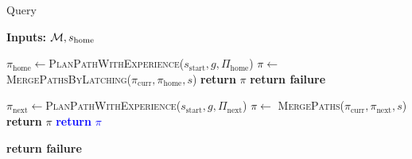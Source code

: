 \documentclass[conference]{IEEEtran}
\begin{document}
\begin{algorithm}[t]
\caption{Query}\label{alg:query}  
    \AlgFontSize
\hspace*{\algorithmicindent} \textbf{Inputs:} $\mathcal{M}, s_{\textrm{home}}$
\begin{algorithmic}[1]
 
            \State $\pi_{\textrm{home}} \leftarrow$\textsc{PlanPathWithExperience}($s_{\textrm{start}},g,\Pi_{\textrm{home}}$)
            \State $\pi \leftarrow$ \textsc{MergePathsByLatching}($\pi_{\textrm{curr}},\pi_{\textrm{home}}, s$)
            \State \textbf{return} $\pi$
            \label{alg:query:line:c3b}
        \EndIf
    \EndIf
\State \textbf{return failure}
\EndProcedure
\vspace{2mm}
	 
        \label{alg:query:line:c2a}
         
     
        \State $\pi_{\textrm{next}} \leftarrow$\textsc{PlanPathWithExperience}($s_{\textrm{start}},g,\Pi_{\textrm{next}}$)
        \State $\pi \leftarrow$ \textsc{MergePaths}($\pi_{\textrm{curr}},\pi_{\textrm{next}},s$)
        \State \textbf{return} $\pi$
        \label{alg:query:line:c2b}
    \EndIf
%
%
	\textcolor{blue}{
		\State \textbf{return} $\pi$
	\EndIf
	}

\EndFor
	\State \textbf{return failure} 
\EndProcedure
\end{algorithmic}
\end{algorithm}
\end{document}

